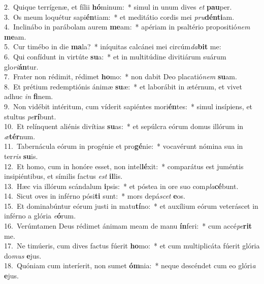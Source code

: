 {2.~}Quique terrígenæ, et fílii \textbf{hó}minum:~* simul in unum dives \textit{et} \textbf{pau}per.\\
{3.~}Os meum loquétur sapi\textbf{én}tiam:~* et meditátio cordis mei \textit{pru}\textbf{dén}\textbf{ti}am.\\
{4.~}Inclinábo in parábolam aurem \textbf{me}am:~* apériam in psaltério propositió\textit{nem} \textbf{me}am.\\
{5.~}Cur timébo in die \textbf{ma}la?~* iníquitas calcánei mei circúm\textit{da}\textbf{bit} me:\\
{6.~}Qui confídunt in virtúte \textbf{su}a:~* et in multitúdine divitiárum suárum glo\textit{ri}\textbf{án}tur.\\
{7.~}Frater non rédimit, rédimet \textbf{ho}mo:~* non dabit Deo placatió\textit{nem} \textbf{su}am.\\
{8.~}Et prétium redemptiónis ánimæ \textbf{su}æ:~* et laborábit in ætérnum, et vivet adhuc \textit{in} \textbf{fi}nem.\\
{9.~}Non vidébit intéritum, cum víderit sapiéntes mori\textbf{én}tes:~* simul insípiens, et stultus \textit{pe}\textbf{rí}bunt.\\
{10.~}Et relínquent aliénis divítias \textbf{su}as:~* et sepúlcra eórum domus illórum in \textit{æ}\textbf{tér}num.\\
{11.~}Tabernácula eórum in progénie et pro\textbf{gé}nie:~* vocavérunt nómina sua in ter\textit{ris} \textbf{su}is.\\
{12.~}Et homo, cum in honóre esset, non intel\textbf{lé}xit:~* comparátus est juméntis insipiéntibus, et símilis factus \textit{est} \textbf{il}lis.\\
{13.~}Hæc via illórum scándalum \textbf{i}psis:~* et póstea in ore suo com\textit{pla}\textbf{cé}bunt.\\
{14.~}Sicut oves in inférno pósi\textbf{ti} sunt:~* mors depá\textit{scet} \textbf{e}os.\\
{15.~}Et dominabúntur eórum justi in matu\textbf{tí}no:~* et auxílium eórum veteráscet in inférno a glória \textit{e}\textbf{ó}rum.\\
{16.~}Verúmtamen Deus rédimet ánimam meam de manu \textbf{ín}feri:~* cum accé\textit{pe}\textbf{rit} me.\\
{17.~}Ne timúeris, cum dives factus fúerit \textbf{ho}mo:~* et cum multiplicáta fúerit glória do\textit{mus} \textbf{e}jus.\\
{18.~}Quóniam cum interíerit, non sumet \textbf{óm}nia:~* neque descéndet cum eo glóri\textit{a} \textbf{e}jus.\\
